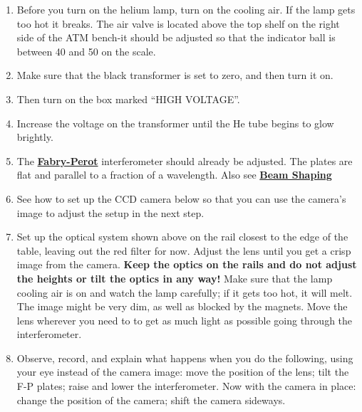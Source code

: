 \documentclass{../lab}
\begin{document}
\begin{enumerate}
    \item Before you turn on the helium lamp, turn on the cooling air. If the lamp gets too hot it breaks. The air valve is located above the top shelf on the right side of the ATM bench-it should be adjusted so that the indicator ball is between 40 and 50 on the scale.

    \item Make sure that the black transformer is set to zero, and then turn it on.

    \item Then turn on the box marked ``HIGH VOLTAGE''. 
    \item Increase the voltage on the transformer until the He tube begins to glow brightly.

    \item The \href{https://drive.google.com/file/d/1OeIjmG3ibyWh8FBix_1Bb9S8dFVAEwx-/view?usp=drive_link}{\textbf{Fabry-Perot}} interferometer should already be adjusted. The plates are flat and parallel to a fraction of a wavelength. Also see  \href{https://drive.google.com/file/d/18TUdvJMHsuD4dBsloQYzpjaqiQ9WX-Ka/view?usp=drive_link}{\textbf{Beam Shaping}}

    \item See how to set up the CCD camera below so that you can use the camera's image to adjust the setup in the next step.

    \item Set up the optical system shown above on the rail closest to the edge of the table, leaving out the red filter for now. Adjust the lens until you get a crisp image from the camera. \textbf{Keep the optics on the rails and do not adjust the heights or tilt the optics in any way!} Make sure that the lamp cooling air is on and watch the lamp carefully; if it gets too hot, it will melt. The image might be very dim, as well as blocked by the magnets. Move the lens wherever you need to to get as much light as possible going through the interferometer.
    
    

    \item Observe, record, and explain what happens when you do the following, using your eye instead of the camera image: move the position of the lens; tilt the F-P plates; raise and lower the interferometer. Now with the camera in place: change the position of the camera; shift the camera sideways.


\end{enumerate}
\end{document}
